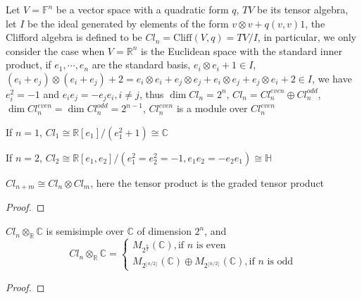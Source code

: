 \documentclass[../main.tex]{subfiles}
\begin{document}
\begin{definition}
Let $V=\mathbb F^n$ be a vector space with a quadratic form $q$, $TV$ be its tensor algebra, let $I$ be the ideal generated by elements of the form $v\otimes v+q(v,v)1$, the Clifford algebra is defined to be $Cl_n=\mathrm{Cliff}(V,q)=TV/I$, in particular, we only consider the case when $V=\mathbb R^n$ is the Euclidean space with the standard inner product, if $e_1,\cdots,e_n$ are the standard basis, $e_i\otimes e_i+1\in I$, $(e_i+e_j)\otimes (e_i+e_j)+2=e_i\otimes e_i+e_j\otimes e_j+e_i\otimes e_j+e_j\otimes e_i+2\in I$, we have $e_i^2=-1$ and $e_ie_j=-e_je_i,i\neq j$, thus $\dim Cl_n=2^n$, $Cl_n=Cl_n^{even}\oplus Cl_n^{odd}$, $\dim Cl_n^{even}=\dim Cl_n^{odd}=2^{n-1}$, $Cl_n^{even}$ is a module over $Cl_n^{even}$
\end{definition}

\begin{example}
If $n=1$, $Cl_1\cong\mathbb R[e_1]/(e_1^2+1)\cong\mathbb C$ \par
If $n=2$, $Cl_2\cong\mathbb R[e_1,e_2]/(e_1^2=e_2^2=-1,e_1e_2=-e_2e_1)\cong\mathbb H$
\end{example}

\begin{proposition}
$Cl_{n+m}\cong Cl_n\otimes Cl_m$, here the tensor product is the graded tensor product
\end{proposition}

\begin{proof}

\end{proof}

\begin{proposition}
$Cl_n\otimes_{\mathbb R}\mathbb C$ is semisimple over $\mathbb C$ of dimension $2^n$, and $$Cl_n\otimes_{\mathbb R}\mathbb C=\begin{cases}
M_{2^{\frac{n}{2}}}(\mathbb C), \text{if } n \text{ is even} \\
M_{2^{\lfloor n/2\rfloor}}(\mathbb C)\oplus M_{2^{\lfloor n/2\rfloor}}(\mathbb C), \text{if } n \text{ is odd}
\end{cases}$$
\end{proposition}

\begin{proof}

\end{proof}
\end{document}

